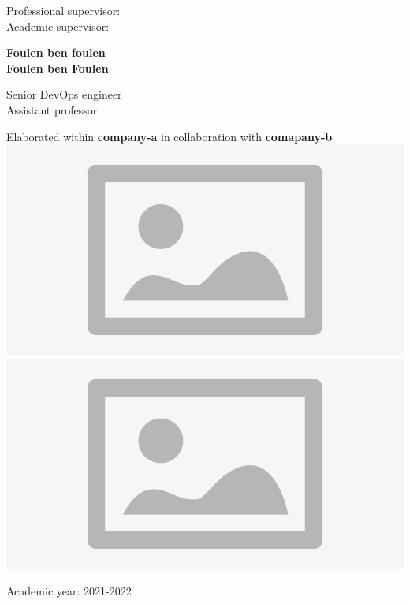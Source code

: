 \vskip1cm%
\begin{center}
\begin{minipage}[c]{0.3\columnwidth}
Professional supervisor:\\
Academic supervisor:
\end{minipage}
\hfill
\begin{minipage}[c]{0.3\columnwidth}
\textbf{Foulen ben foulen}\\
\textbf{Foulen ben Foulen}
\end{minipage}
\hfill
\begin{minipage}[c]{0.3\columnwidth}
Senior DevOps engineer\\
Assistant professor
\end{minipage}
\end{center}
\vskip1cm
\begin{center}
{Elaborated within \textbf{company-a} in collaboration with \textbf{comapany-b}}\\
\includegraphics[width=0.35\columnwidth]{figures/placeholder.png}
\hspace{2cm}
\includegraphics[width=0.35\columnwidth]{figures/placeholder.png}\\
\end{center}
\vskip1cm%
\begin{center}
{\textrm{Academic year: 2021-2022}}\\
\end{center}
\vfill
